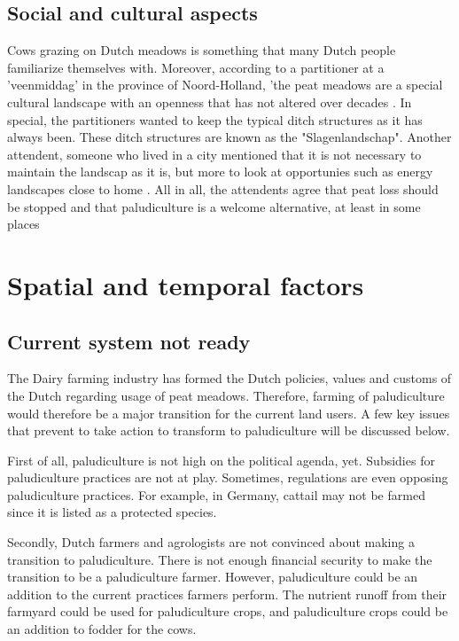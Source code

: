 \documentclass[a4paper,12pt]{scrbook}
\begin{document}
\subsection{Social and cultural aspects}
Cows grazing on Dutch meadows is something that many Dutch people familiarize themselves with. Moreover, according to a partitioner at a 'veenmiddag' in the province of Noord-Holland, 'the peat meadows are a special cultural landscape with an openness that has not altered over decades \citep{Dosker2017}. In special, the partitioners wanted to keep the typical ditch structures as it has always been. These ditch structures are known as the "Slagenlandschap". Another attendent, someone who lived in a city mentioned that it is not necessary to maintain the landscap as it is, but more to look at opportunies such as energy landscapes close to home \citep{Dosker2017}. All in all, the attendents agree that peat loss should be stopped and that paludiculture is a welcome alternative, at least in some places \citep{Dosker2017}


\section{Spatial and temporal factors}

\subsection{Current system not ready}
The Dairy farming industry has formed the Dutch policies, values and customs of the Dutch regarding usage of peat meadows. Therefore, farming of paludiculture would therefore be a major transition for the current land users. A few key issues that prevent to take action to transform to paludiculture will be discussed below.

First of all, paludiculture is not high on the political agenda, yet. Subsidies for paludiculture practices are not at play. Sometimes, regulations are even opposing paludiculture practices. For example, in Germany, cattail may not be farmed since it is listed as a protected species. 

Secondly, Dutch farmers and agrologists are not convinced about making a transition to paludiculture. There is not enough financial security to make the transition to be a paludiculture farmer. However, paludiculture could be an addition to the current practices farmers perform. The nutrient runoff from their farmyard could be used for paludiculture crops, and paludiculture crops could be an addition to fodder for the cows. 
\end{document}
